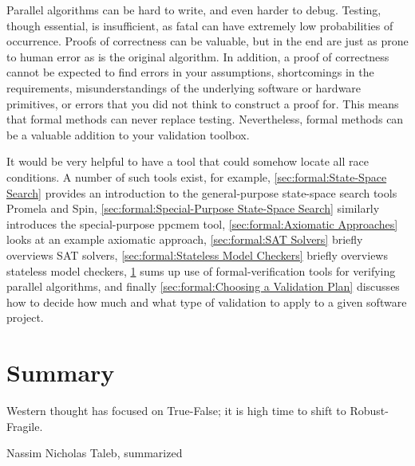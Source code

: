 
%


Parallel algorithms can be hard to write, and even harder to debug.
Testing, though essential, is insufficient, as fatal 
can have extremely low probabilities of occurrence.
Proofs of correctness can be valuable, but in the end are just as
prone to human error as is the original algorithm.
In addition, a proof of correctness cannot be expected to find errors
in your assumptions, shortcomings in the requirements,
misunderstandings of the underlying software or hardware primitives,
or errors that you did not think to construct a proof for.
This means that formal methods can never replace testing.
Nevertheless, formal methods can be a valuable addition to your validation
toolbox.

It would be very helpful to have a tool that could somehow locate
all race conditions.
A number of such tools exist, for example,
\cref{sec:formal:State-Space Search} provides an
introduction to the general-purpose state-space search tools Promela and Spin,
\cref{sec:formal:Special-Purpose State-Space Search}
similarly introduces the special-purpose ppcmem tool,
\cref{sec:formal:Axiomatic Approaches}
looks at an example axiomatic approach,
\cref{sec:formal:SAT Solvers}
briefly overviews SAT solvers,
\cref{sec:formal:Stateless Model Checkers}
briefly overviews stateless model checkers,
\cref{sec:formal:Summary}
sums up use of formal-verification tools for verifying parallel algorithms,
and finally
\cref{sec:formal:Choosing a Validation Plan}
discusses how to decide how much and what type of validation to apply
to a given software project.








\section{Summary}
\label{sec:formal:Summary}
%
\epigraph{Western thought has focused on True-False;
	  it is high time to shift to Robust-Fragile.}
	 {Nassim Nicholas Taleb, summarized}

